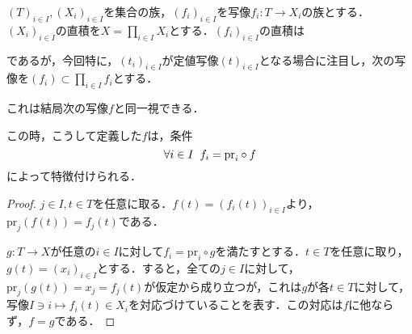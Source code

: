 \documentclass[uplatex, 12pt, dvipdfmx]{jsreport}
\begin{document}
\begin{shadebox}\begin{proposition}[積の普遍性]
    $(T)_{i\in I}, (X_i)_{i\in I}$を集合の族，$(f_i)_{i\in I}$を写像$f_i:T\to X_i$の族とする．$(X_i)_{i\in I}$の直積を$X=\prod_{i\in I}X_i$とする．$(f_i)_{i\in I}$の直積は
    \begin{center}\end{center}
    であるが，今回特に，$(t_i)_{i\in I}$が定値写像$(t)_{i\in I}$となる場合に注目し，次の写像を$(f_i)\subset \prod_{i\in I}f_i$とする．
    \begin{center}\end{center}
    これは結局次の写像$f$と同一視できる．
    \begin{center}\end{center}
    この時，こうして定義した$f$は，条件$$\forall i\in I \hspace{2mm} f_i=\mathrm{pr}_i\circ f$$
    によって特徴付けられる．
\end{proposition}\end{shadebox}
\begin{proof}
    $j\in I, t\in T$を任意に取る．$f(t)=(f_i(t))_{i\in I}$より，$\mathrm{pr}_j(f(t))=f_j(t)$である．

    $g:T\to X$が任意の$i\in I$に対して$f_i=\mathrm{pr}_i\circ g$を満たすとする．$t\in T$を任意に取り，$g(t)=(x_i)_{i\in I}$とする．すると，全ての$j\in I$に対して，$\mathrm{pr}_j(g(t))=x_j=f_j(t)$が仮定から成り立つが，これは$g$が各$t\in T$に対して，写像$I\ni i\mapsto f_i(t)\in X_i$を対応づけていることを表す．この対応は$f$に他ならず，$f=g$である．
\end{proof}
\end{document}
